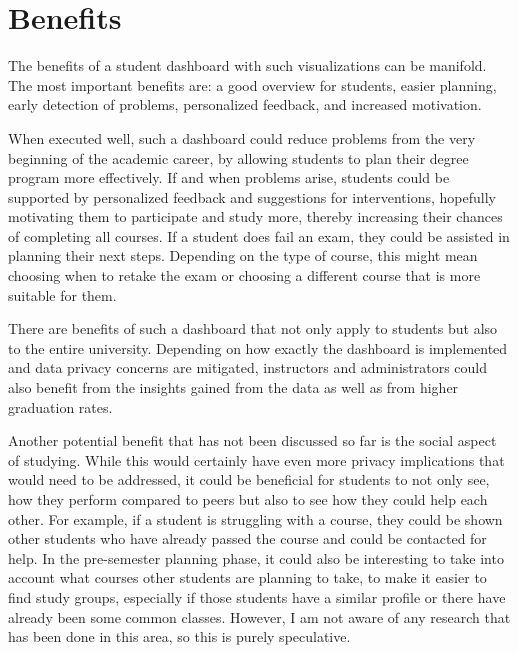 \section{Benefits}
\label{sec:benefits}

The benefits of a student dashboard with such visualizations can be manifold.
The most important benefits are: a good overview for students, easier planning, early detection of problems, personalized feedback, and increased motivation.

When executed well, such a dashboard could reduce problems from the very beginning of the academic career, by allowing students to plan their degree program more effectively.
If and when problems arise, students could be supported by personalized feedback and suggestions for interventions, hopefully motivating them to participate and study more, thereby increasing their chances of completing all courses. If a student does fail an exam, they could be assisted in planning their next steps. Depending on the type of course, this might mean choosing when to retake the exam or choosing a different course that is more suitable for them.

There are benefits of such a dashboard that not only apply to students but also to the entire university. Depending on how exactly the dashboard is implemented and data privacy concerns are mitigated, instructors and administrators could also benefit from the insights gained from the data as well as from higher graduation rates.

Another potential benefit that has not been discussed so far is the social aspect of studying. While this would certainly have even more privacy implications that would need to be addressed, it could be beneficial for students to not only see, how they perform compared to peers but also to see how they could help each other.
For example, if a student is struggling with a course, they could be shown other students who have already passed the course and could be contacted for help.
In the pre-semester planning phase, it could also be interesting to take into account what courses other students are planning to take, to make it easier to find study groups, especially if those students have a similar profile or there have already been some common classes.
However, I am not aware of any research that has been done in this area, so this is purely speculative.
